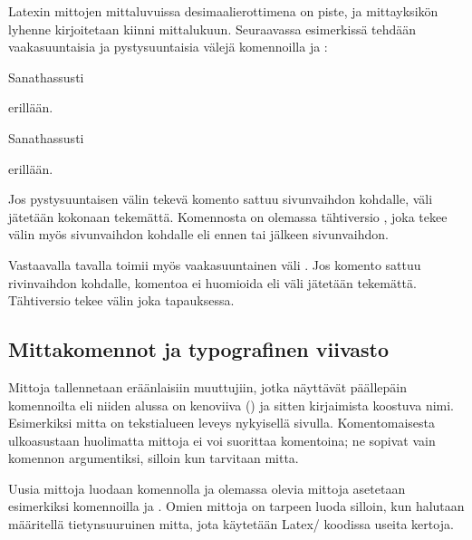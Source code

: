 Latexin mittojen mittaluvuissa desimaalierottimena on piste, ja
mittayksikön lyhenne kirjoitetaan kiinni mittalukuun. Seuraavassa
esimerkissä tehdään vaakasuuntaisia ja pystysuuntaisia välejä
komennoilla  ja :

\begin{koodilohkosis}
Sanat\hspace{1.2cm}hassusti
\vspace{2mm}

\hspace{1.75em}erillään.
\end{koodilohkosis}

\begin{tulossis}
  Sanat\hspace{1.2cm}hassusti  \nopagebreak
  \vspace{2mm}

  \hspace{1.75em}erillään.
\end{tulossis}

\noindent
Jos pystysuuntaisen välin tekevä komento  sattuu
sivunvaihdon kohdalle, väli jätetään kokonaan tekemättä. Komennosta on
olemassa tähtiversio , joka tekee välin myös
sivunvaihdon kohdalle eli ennen tai jälkeen sivunvaihdon.

Vastaavalla tavalla toimii myös vaakasuuntainen väli .
Jos komento sattuu rivinvaihdon kohdalle, komentoa ei huomioida eli väli
jätetään tekemättä. Tähtiversio  tekee välin joka
tapauksessa.

\subsection{Mittakomennot ja typografinen viivasto}

Mittoja tallennetaan eräänlaisiin muuttujiin, jotka näyttävät päällepäin
komennoilta eli niiden alussa on kenoviiva (\koodi{\keno}) ja sitten
kirjaimista koostuva nimi. Esimerkiksi mitta  on
tekstialueen leveys nykyisellä sivulla. Komentomaisesta ulkoasustaan
huolimatta mittoja ei voi suorittaa komentoina; ne sopivat vain komennon
argumentiksi, silloin kun tarvitaan mitta.

Uusia mittoja luodaan komennolla  ja olemassa olevia
mittoja asetetaan esimerkiksi komennoilla  ja
. Omien mittoja on tarpeen luoda silloin, kun
halutaan määritellä tietynsuuruinen mitta, jota käytetään Latex\-/
koodissa useita kertoja.

